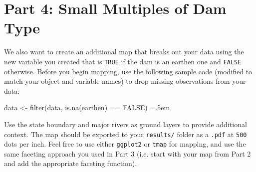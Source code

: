 \documentclass{tufte-handout}
\newenvironment{codeBlock}
 {\SaveVerbatim{cverb}}
 {\endSaveVerbatim
  \flushleft\fboxrule=0pt\fboxsep=.5em
  \colorbox{cverbbg}{%
    \makebox[\dimexpr\linewidth-2\fboxsep][l]{\BUseVerbatim{cverb}}%
  }
  \endflushleft
}
\begin{document}
\vspace{5mm}
\section{Part 4: Small Multiples of Dam Type}
We also want to create an additional map that breaks out your data using the new variable you created that is \texttt{TRUE} if the dam is an earthen one and \texttt{FALSE} otherwise. Before you begin mapping, use the following sample code (modified to match your object and variable names) to drop missing observations from your data:

\begin{codeBlock}
data <- filter(data, is.na(earthen) == FALSE)
\end{codeBlock}

\par \noindent Use the state boundary and major rivers as ground layers to provide additional context. The map should be exported to your \texttt{results/} folder as a \texttt{.pdf} at \texttt{500} dots per inch. Feel free to use either \texttt{ggplot2} or \texttt{tmap} for mapping, and use the same faceting approach you used in Part 3 (i.e. start with your map from Part 2 and add the appropriate faceting function).

\end{document}
